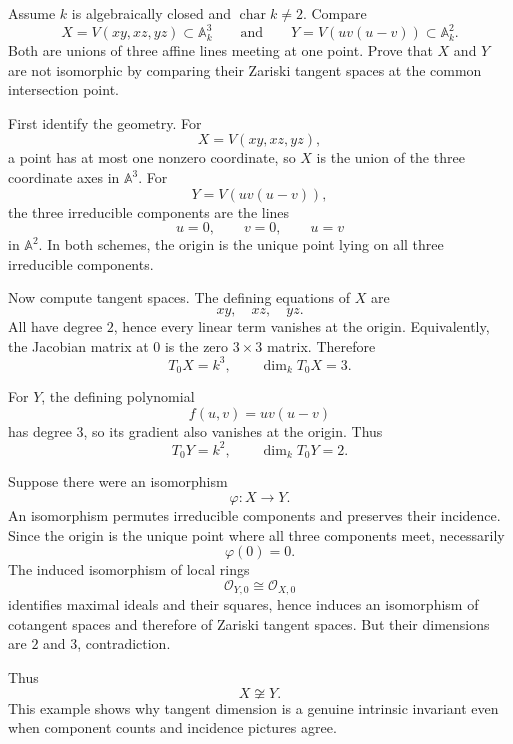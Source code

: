 \begin{problem}\label{prob:vi32-20}
Assume \(k\) is algebraically closed and \(\operatorname{char}k\neq2\). Compare
\[
X=V(xy,xz,yz)\subset\mathbb A^3_k
\qquad\text{and}\qquad
Y=V(uv(u-v))\subset\mathbb A^2_k.
\]
Both are unions of three affine lines meeting at one point. Prove that \(X\) and \(Y\) are not isomorphic by comparing their Zariski tangent spaces at the common intersection point.

\end{problem}

\ifdefined\FullProblemDossiers
\begin{solution}
First identify the geometry. For
\[
X=V(xy,xz,yz),
\]
a point has at most one nonzero coordinate, so \(X\) is the union of the three coordinate axes in \(\mathbb A^3\).
For
\[
Y=V(uv(u-v)),
\]
the three irreducible components are the lines
\[
u=0,\qquad v=0,\qquad u=v
\]
in \(\mathbb A^2\). In both schemes, the origin is the unique point lying on all three irreducible components.

Now compute tangent spaces. The defining equations of \(X\) are
\[
xy,\quad xz,\quad yz.
\]
All have degree \(2\), hence every linear term vanishes at the origin. Equivalently, the Jacobian matrix at \(0\) is
the zero \(3\times3\) matrix. Therefore
\[
T_0X=k^3,
\qquad
\dim_kT_0X=3.
\]

For \(Y\), the defining polynomial
\[
f(u,v)=uv(u-v)
\]
has degree \(3\), so its gradient also vanishes at the origin. Thus
\[
T_0Y=k^2,
\qquad
\dim_kT_0Y=2.
\]

Suppose there were an isomorphism
\[
\varphi:X\to Y.
\]
An isomorphism permutes irreducible components and preserves their incidence. Since the origin is the unique point
where all three components meet, necessarily
\[
\varphi(0)=0.
\]
The induced isomorphism of local rings
\[
\mathcal O_{Y,0}\cong\mathcal O_{X,0}
\]
identifies maximal ideals and their squares, hence induces an isomorphism of cotangent spaces and therefore of
Zariski tangent spaces. But their dimensions are \(2\) and \(3\), contradiction.

Thus
\[
\boxed{X\not\cong Y}.
\]
This example shows why tangent dimension is a genuine intrinsic invariant even when component counts and incidence
pictures agree.
\end{solution}
\fi
